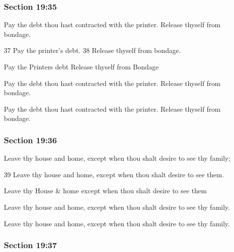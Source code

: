 	\subsubsection{Section 19:35} %
		\label{DC19-35}

		Pay the debt thou hast contracted with the printer. Release thyself from bondage.

		\begin{framed}
		\scriptsize
			\begin{compactdesc}
				\item[JSP] 37 Pay the printer's debt. 38 Release thyself from bondage.
				\item[RB1] Pay the Printers debt Release thyself from Bondage
				\item[DC 1835] Pay the debt thou hast contracted with the printer. Release thyself from bondage. 
				\item[DC 1844] Pay the debt thou hast contracted with the printer. Release thyself from bondage. 
			\end{compactdesc}
		\end{framed}

	\subsubsection{Section 19:36} %
		\label{DC19-36}

		Leave thy house and home, except when thou shalt desire to see thy family;

		\begin{framed}
		\scriptsize
			\begin{compactdesc}
				\item[JSP] 39 Leave thy house and home, except when thou shalt desire to see them.
				\item[RB1] Leave thy House \& home except when thou shalt desire to see them
				\item[DC 1835] Leave thy house and home, except when thou shalt desire to see thy family. 
				\item[DC 1844] Leave thy house and home, except when thou shalt desire to see thy family. 
			\end{compactdesc}
		\end{framed}

	\subsubsection{Section 19:37} %
		\label{DC19-37}

